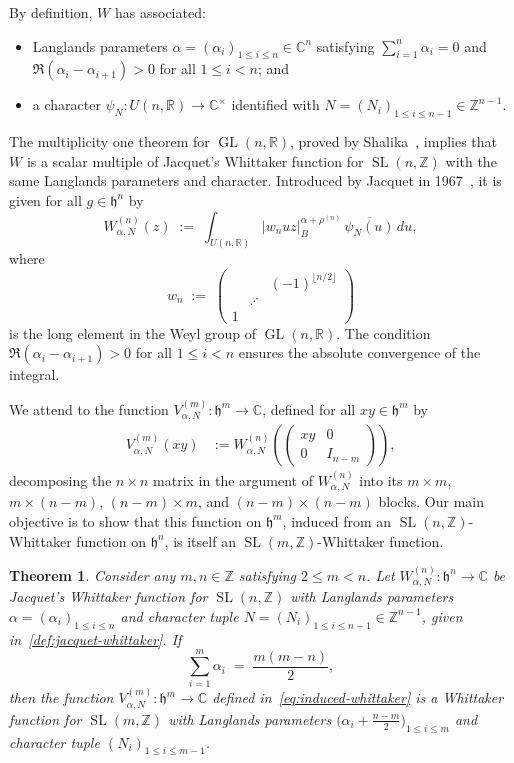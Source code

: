 \documentclass[12pt, reqno, oneside]{amsart}
\newtheorem{theorem}{Theorem}[section]
\theoremstyle{definition}
\numberwithin{equation}{section}
\newcommand{\Z}{\mathbb{Z}}
\newcommand{\R}{\mathbb{R}}
\newcommand{\C}{\mathbb{C}}
\newcommand{\hh}{\mathfrak{h}}
\DeclareMathOperator{\GL}{GL}
\DeclareMathOperator{\SL}{SL}
\begin{document}
By definition, $W$ has associated:
\begin{itemize}
  \item Langlands parameters $\alpha=(\alpha_i)_{1\leq i\leq n}\in\C^n$
    satisfying $\sum_{i=1}^n\alpha_i=0$ and
    $\Re(\alpha_i-\alpha_{i+1})>0$ for all $1\leq i<n$; and
  \item a character $\psi_N:U(n,\R)\to\C^\times$ identified with
    $N=(N_i)_{1\leq i\leq n-1}\in\Z^{n-1}$.
\end{itemize}
The multiplicity one theorem for $\GL(n,\R)$, proved by
Shalika~\cite{Sha74}, implies that $W$ is a scalar multiple of Jacquet's
Whittaker function for $\SL(n,\Z)$ with the same Langlands parameters and
character. Introduced by Jacquet in 1967~\cite{Jac67}, it is given for all
$g\in\hh^n$ by
\begin{equation}\label{def:jacquet-whittaker}
  W_{\alpha,N}^{(n)}(z)
  \;:=\;
  \int_{U(n,\R)}
  \bigl|w_n u z\bigr|_B^{\alpha+\rho^{(n)}}
  \,\overline{\psi_N(u)}\,du,
\end{equation}
where
\[
  w_n \;:=\;
  \begin{pmatrix}
    & & (-1)^{\lfloor n/2\rfloor} \\
    & \iddots & \\
    1 & &
  \end{pmatrix}
\]
is the long element in the Weyl group of $\GL(n,\R)$. The condition
$\Re(\alpha_i-\alpha_{i+1})>0$ for all $1\leq i<n$ ensures the absolute
convergence of the integral.

We attend to the function $V_{\alpha,N}^{(m)}:\hh^m\to\C$, defined for all
$xy\in\hh^m$ by
\begin{align}
  V_{\alpha,N}^{(m)}(xy)
  &:= W_{\alpha,N}^{(n)}\!
    \left(
      \begin{pmatrix} xy & 0 \\ 0 & I_{n-m} \end{pmatrix}
    \right),
  \label{eq:induced-whittaker}
\end{align}
decomposing the $n\times n$ matrix in the argument of $W_{\alpha,N}^{(n)}$
into its $m\times m$, $m\times(n-m)$, $(n-m)\times m$, and
$(n-m)\times(n-m)$ blocks. Our main objective is to show that this
function on $\hh^m$, induced from an $\SL(n,\Z)$-Whittaker function on
$\hh^n$, is itself an $\SL(m,\Z)$-Whittaker function.

\begin{theorem}\label{thm:main-thm-body}
Consider any $m,n\in\Z$ satisfying $2\leq m<n$. Let
$W_{\alpha,N}^{(n)}:\hh^n\to\C$ be Jacquet's Whittaker function for
$\SL(n,\Z)$ with Langlands parameters $\alpha=(\alpha_i)_{1\leq i\leq n}$
and character tuple $N=(N_i)_{1\leq i\leq n-1}\in\Z^{n-1}$, given
in~\eqref{def:jacquet-whittaker}. If
\begin{equation}\label{eq:langlands-condition}
  \sum_{i=1}^m \alpha_i \;=\; \frac{m(m-n)}{2},
\end{equation}
then the function $V_{\alpha,N}^{(m)}:\hh^m\to\C$ defined
in~\eqref{eq:induced-whittaker} is a Whittaker function for $\SL(m,\Z)$
with Langlands parameters $\bigl(\alpha_i+\frac{n-m}{2}\bigr)_{1\leq
i\leq m}$ and character tuple $(N_i)_{1\leq i\leq m-1}$.
\end{theorem}
\end{document}
